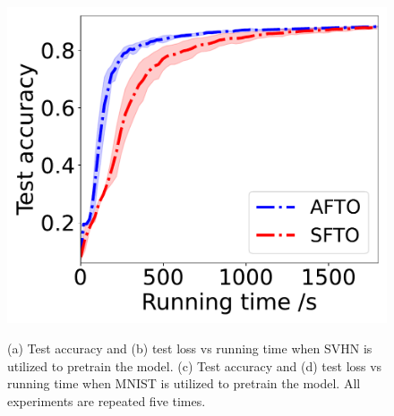\documentclass[letterpaper]{article}
\begin{document}
\begin{figure}[t]
{\begin{minipage}{4.2cm}
\label{fig:dis-pre-mnist-acc}
\includegraphics[scale=0.215]{dis-mnist-acc.pdf}
\end{minipage}}
\caption{(a) Test accuracy and (b) test loss vs running time when SVHN is utilized to pretrain the model. (c) Test accuracy and (d) test loss vs running time  when MNIST is utilized to pretrain the model. All experiments are repeated five times.} %
\label{fig:dis-domain}
\end{figure}
\end{document}
